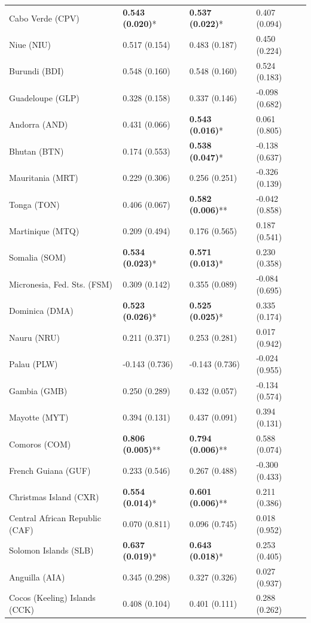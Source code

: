 \begin{longtable}{p{4cm}p{3cm}p{3cm}p{3cm}}
Cabo Verde (CPV) & \textbf{0.543 (0.020)}* & \textbf{0.537 (0.022)}* & 0.407 (0.094) \\
Niue (NIU) & 0.517 (0.154) & 0.483 (0.187) & 0.450 (0.224) \\
Burundi (BDI) & 0.548 (0.160) & 0.548 (0.160) & 0.524 (0.183) \\
Guadeloupe (GLP) & 0.328 (0.158) & 0.337 (0.146) & -0.098 (0.682) \\
Andorra (AND) & 0.431 (0.066) & \textbf{0.543 (0.016)}* & 0.061 (0.805) \\
Bhutan (BTN) & 0.174 (0.553) & \textbf{0.538 (0.047)}* & -0.138 (0.637) \\
Mauritania (MRT) & 0.229 (0.306) & 0.256 (0.251) & -0.326 (0.139) \\
Tonga (TON) & 0.406 (0.067) & \textbf{0.582 (0.006)}** & -0.042 (0.858) \\
Martinique (MTQ) & 0.209 (0.494) & 0.176 (0.565) & 0.187 (0.541) \\
Somalia (SOM) & \textbf{0.534 (0.023)}* & \textbf{0.571 (0.013)}* & 0.230 (0.358) \\
Micronesia, Fed. Sts. (FSM) & 0.309 (0.142) & 0.355 (0.089) & -0.084 (0.695) \\
Dominica (DMA) & \textbf{0.523 (0.026)}* & \textbf{0.525 (0.025)}* & 0.335 (0.174) \\
Nauru (NRU) & 0.211 (0.371) & 0.253 (0.281) & 0.017 (0.942) \\
Palau (PLW) & -0.143 (0.736) & -0.143 (0.736) & -0.024 (0.955) \\
Gambia (GMB) & 0.250 (0.289) & 0.432 (0.057) & -0.134 (0.574) \\
Mayotte (MYT) & 0.394 (0.131) & 0.437 (0.091) & 0.394 (0.131) \\
Comoros (COM) & \textbf{0.806 (0.005)}** & \textbf{0.794 (0.006)}** & 0.588 (0.074) \\
French Guiana (GUF) & 0.233 (0.546) & 0.267 (0.488) & -0.300 (0.433) \\
Christmas Island (CXR) & \textbf{0.554 (0.014)}* & \textbf{0.601 (0.006)}** & 0.211 (0.386) \\
Central African Republic (CAF) & 0.070 (0.811) & 0.096 (0.745) & 0.018 (0.952) \\
Solomon Islands (SLB) & \textbf{0.637 (0.019)}* & \textbf{0.643 (0.018)}* & 0.253 (0.405) \\
Anguilla (AIA) & 0.345 (0.298) & 0.327 (0.326) & 0.027 (0.937) \\
Cocos (Keeling) Islands (CCK) & 0.408 (0.104) & 0.401 (0.111) & 0.288 (0.262) \\

\end{longtable}
